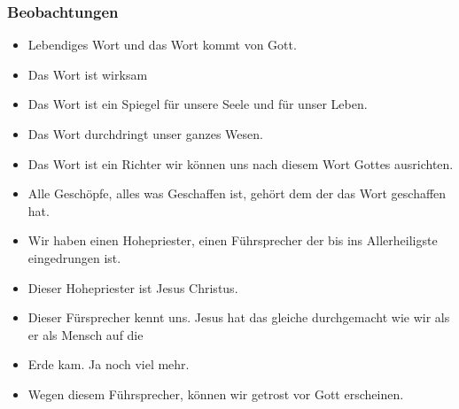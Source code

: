 \subsubsection{Beobachtungen}
\begin{itemize}
    \item Lebendiges Wort und das Wort kommt von Gott.
    \item Das Wort ist wirksam
    \item Das Wort ist ein Spiegel für unsere Seele und für unser Leben.
    \item Das Wort durchdringt unser ganzes Wesen.
    \item Das Wort ist ein Richter wir können uns nach diesem Wort Gottes ausrichten.
    \item Alle Geschöpfe, alles was Geschaffen ist, gehört dem der das Wort geschaffen hat.
    \item Wir haben einen Hohepriester, einen Führsprecher der bis ins Allerheiligste eingedrungen ist.
    \item Dieser Hohepriester ist Jesus Christus.
    \item Dieser Fürsprecher kennt uns. Jesus hat das gleiche durchgemacht wie wir als er als Mensch auf die \item Erde kam. Ja noch viel mehr.
\item Wegen diesem Führsprecher, können wir getrost vor Gott erscheinen.
\end{itemize}

